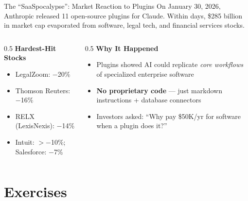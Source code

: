 \documentclass[aspectratio=169]{beamer}
\begin{document}
\begin{frame}[shrink=10]{The ``SaaSpocalypse'': Market Reaction to Plugins}
On January 30, 2026, Anthropic released 11 open-source plugins for Claude.  Within days, \alert{\$285 billion} in market cap evaporated from software, legal tech, and financial services stocks.
\vspace{0.2cm}
\begin{columns}[T]
\begin{column}{0.5\textwidth}
\textbf{Hardest-Hit Stocks}
\begin{itemize}\small
  \item LegalZoom: $-$20\%
  \item Thomson Reuters: $-$16\%
  \item RELX (LexisNexis): $-$14\%
  \item Intuit: $>-$10\%; Salesforce: $-$7\%
\end{itemize}
\end{column}
\begin{column}{0.5\textwidth}
\textbf{Why It Happened}
\begin{itemize}\small
  \item Plugins showed AI could replicate \textit{core workflows} of specialized enterprise software
  \item \textbf{No proprietary code} --- just markdown instructions + database connectors
  \item Investors asked: ``Why pay \$50K/yr for software when a plugin does it?''
\end{itemize}
\end{column}
\end{columns}
\end{frame}

\section{Exercises}
\end{document}
